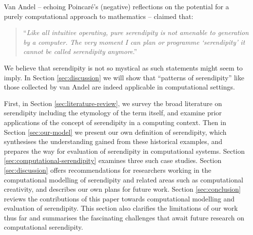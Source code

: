 Van Andel \citeyear{van1994anatomy} -- echoing Poincar\'e's
\citeyear{poincare1910creation} (negative) reflections on the potential
for a purely computational approach to mathematics -- claimed that:
\begin{quote}
``\emph{Like all intuitive operating, pure serendipity is not amenable
    to generation by a computer.  The very moment I can plan or
    programme `serendipity' it cannot be called serendipity
    anymore}.'' \cite{van1994anatomy}
\end{quote}
We believe that serendipity is not so mystical as such statements
might seem to imply.  In Section \ref{sec:discussion} we will
show that ``patterns of serendipity'' like those collected by van Andel
are indeed applicable in computational settings.

First, in
Section \ref{sec:literature-review}, we survey the broad literature on
serendipity including the etymology of the term itself, and examine prior applications of the concept of serendipity in a computing context.  Then in Section \ref{sec:our-model} we present our own
definition of serendipity, which synthesises the understanding gained from these historical examples, and prepares the way for evaluation of serendipity in computational systems.  Section
\ref{sec:computational-serendipity} examines
three such case studies.  Section
\ref{sec:discussion} offers recommendations for researchers working in the computational modelling of serendipity and related areas such as computational creativity, and describes our own plans for future
work.  Section \ref{sec:conclusion} reviews the contributions of this paper towards computational modelling and evaluation of serendipity.  This section also clarifies the limitations of our work thus far and summarises the fascinating challenges that await future research on computational serendipity.


